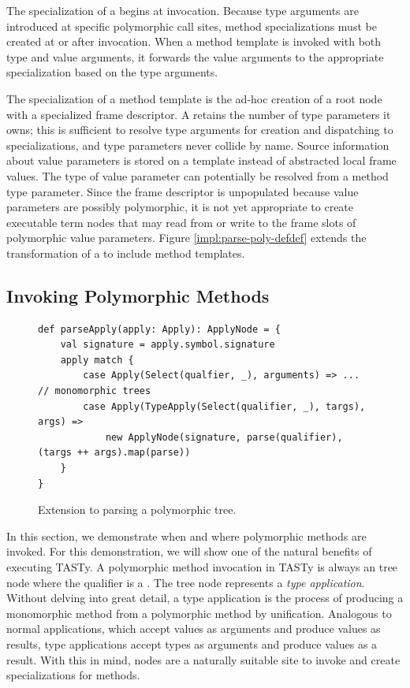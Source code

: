 The specialization of a  begins at invocation.
Because type arguments are introduced at specific polymorphic call sites, method specializations must be created at or after invocation.
When a method template is invoked with both type and value arguments, it forwards the value arguments to the appropriate specialization based on the type arguments.

The specialization of a method template is the ad-hoc creation of a root node with a specialized frame descriptor.
A  retains the number of type parameters it owns; this is sufficient to resolve type arguments for creation and dispatching to specializations, and type parameters never collide by name.
Source information about value parameters is stored on a template instead of abstracted local frame values.
The type of value parameter can potentially be resolved from a method type parameter.
Since the frame descriptor is unpopulated because value parameters are possibly polymorphic, it is not yet appropriate to create executable term nodes that may read from or write to the frame slots of polymorphic value parameters.
Figure \ref{impl:parse-poly-defdef} extends the transformation of a  to include method templates.

\subsection{Invoking Polymorphic Methods}

\begin{figure}[!htb]
\begin{verbatim}
def parseApply(apply: Apply): ApplyNode = {
	val signature = apply.symbol.signature
	apply match {
		case Apply(Select(qualfier, _), arguments) => ... // monomorphic trees
		case Apply(TypeApply(Select(qualifier, _), targs), args) =>
			new ApplyNode(signature, parse(qualifier), (targs ++ args).map(parse))
	}
}
\end{verbatim}
\caption{Extension to parsing a polymorphic  tree.}
\label{impl:parse-typeapply}
\end{figure}

In this section, we demonstrate when and where polymorphic methods are invoked.
For this demonstration, we will show one of the natural benefits of executing TASTy.
A polymorphic method invocation in TASTy is always an  tree node where the qualifier is a .
The  tree node represents a \textit{type application}.
Without delving into great detail, a type application is the process of producing a monomorphic method from a polymorphic method by unification.
Analogous to normal applications, which accept values as arguments and produce values as results, type applications accept types as arguments and produce values as a result.
With this in mind,  nodes are a naturally suitable site to invoke and create specializations for methods.

